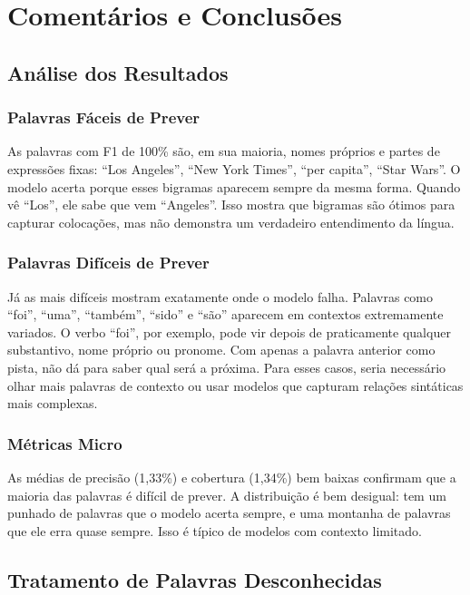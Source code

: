 \documentclass[12pt,a4paper]{article}
\begin{document}
\section{Comentários e Conclusões}

\subsection{Análise dos Resultados}

\subsubsection{Palavras Fáceis de Prever}

As palavras com F1 de 100\% são, em sua maioria, nomes próprios e partes de expressões fixas: ``Los Angeles'', ``New York Times'', ``per capita'', ``Star Wars''. O modelo acerta porque esses bigramas aparecem sempre da mesma forma. Quando vê ``Los'', ele sabe que vem ``Angeles''. Isso mostra que bigramas são ótimos para capturar colocações, mas não demonstra um verdadeiro entendimento da língua.

\subsubsection{Palavras Difíceis de Prever}

Já as mais difíceis mostram exatamente onde o modelo falha. Palavras como ``foi'', ``uma'', ``também'', ``sido'' e ``são'' aparecem em contextos extremamente variados. O verbo ``foi'', por exemplo, pode vir depois de praticamente qualquer substantivo, nome próprio ou pronome. Com apenas a palavra anterior como pista, não dá para saber qual será a próxima. Para esses casos, seria necessário olhar mais palavras de contexto ou usar modelos que capturam relações sintáticas mais complexas.

\subsubsection{Métricas Micro}

As médias de precisão (1,33\%) e cobertura (1,34\%) bem baixas confirmam que a maioria das palavras é difícil de prever. A distribuição é bem desigual: tem um punhado de palavras que o modelo acerta sempre, e uma montanha de palavras que ele erra quase sempre. Isso é típico de modelos com contexto limitado.

\subsection{Tratamento de Palavras Desconhecidas}
\end{document}

